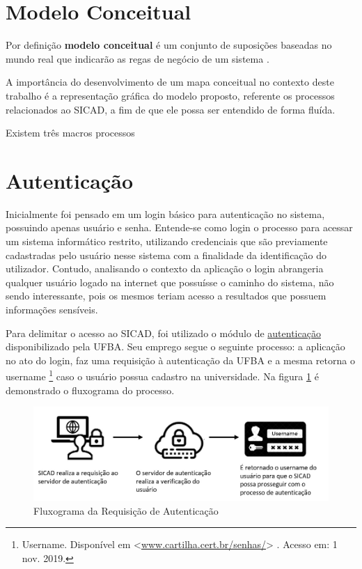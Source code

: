\documentclass[12pt, a4paper]{report}
\begin{document}
\section{ Modelo Conceitual}
Por definição \textbf{modelo conceitual} é um conjunto de suposições baseadas no mundo real que indicarão as regas de negócio de um sistema \citep{mapaconceitual}.

A importância do desenvolvimento de um mapa conceitual no contexto deste trabalho é a representação gráfica do modelo proposto, referente os processos relacionados ao \ac{SICAD}, a fim de que ele possa ser entendido de forma fluída.

Existem três macros processos   

\section{ Autenticação}

Inicialmente foi pensado em um login básico para autenticação no sistema, possuindo apenas usuário e senha. Entende-se como login o processo para acessar um sistema informático restrito, utilizando credenciais que são previamente cadastradas pelo usuário nesse sistema com a finalidade da identificação do utilizador. Contudo, analisando o contexto da aplicação o login abrangeria qualquer usuário logado na internet que possuísse o caminho do sistema, não sendo interessante, pois os mesmos teriam acesso a resultados que possuem informações sensíveis.

Para delimitar o acesso ao \ac{SICAD}, foi utilizado o módulo de \href{https://www.autenticacao.ufba.br}{autenticação} disponibilizado pela \ac{UFBA}. Seu emprego segue o seguinte processo: a aplicação no ato do login, faz uma requisição à autenticação da \ac{UFBA} e a mesma retorna o username \footnote{Username. Disponível em <\url{www.cartilha.cert.br/senhas/}> . Acesso em: 1 nov. 2019.} caso o usuário possua cadastro na universidade. Na figura \ref{fig:processo_autenticacao} é demonstrado o fluxograma do processo.

\begin{figure}
\centering
\includegraphics[scale=0.50]{processo_autenticacao.jpg}
\caption{Fluxograma da Requisição de Autenticação}
\label{fig:processo_autenticacao}
\end{figure}
\end{document}
